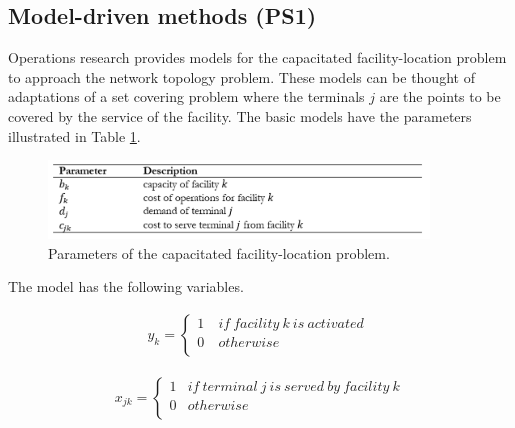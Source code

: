 \subsection{Model-driven methods (PS1)}

Operations research provides models for the capacitated facility-location problem to approach the network topology problem. These models can be thought of adaptations of a set covering problem where the terminals $j$ are the points to be covered by the service of the facility. The basic models have the parameters illustrated in Table \ref{tab_routeTopology}.


\begin{figure}[hbt!]
\centering
\includegraphics[width=0.9\textwidth]{SectionDistribution/design_figures/tab_routeTopology.png}
\captionsetup{type=table}
\caption{Parameters of the capacitated facility-location problem.}
\label{tab_routeTopology}
\end{figure}

The model has the following variables.

\begin{equation}
   \begin{split}
   y_k=\left\{
                \begin{array}{ll}
                  1\ & if\ facility\ k\ is\ activated\ \\
                  0 & otherwise\\
                \end{array}
              \right.
   \end{split}
\end{equation}

\begin{equation}
   \begin{split}
   x_{jk}=\left\{
                \begin{array}{ll}
                  1 & if\ terminal\ j\ is\ served\ by\ facility\ k\\
                  0 & otherwise\\
                \end{array}
              \right.
   \end{split}
\end{equation}


